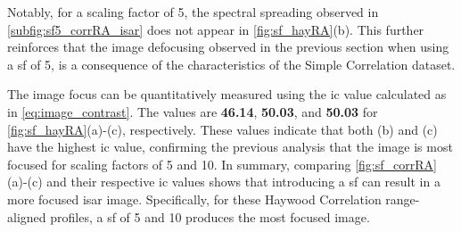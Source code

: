 \documentclass[class=report,11pt,crop=false]{standalone}
\begin{document}
    Notably, for a scaling factor of 5, the spectral spreading observed in \autoref{subfig:sf5_corrRA_isar} does not appear in \autoref{fig:sf_hayRA}(b). This further reinforces that the image defocusing observed in the previous section when using a \gls{sf} of 5, is a consequence of the characteristics of the Simple Correlation dataset.
    
    The image focus can be quantitatively measured using the \gls{ic} value calculated as in \autoref{eq:image_contrast}. The values are \textbf{46.14}, \textbf{50.03}, and \textbf{50.03} for \autoref{fig:sf_hayRA}(a)-(c), respectively. These values indicate that both (b) and (c) have the highest \gls{ic} value, confirming the previous analysis that the image is most focused for scaling factors of 5 and 10. In summary, comparing \autoref{fig:sf_corrRA}(a)-(c) and their respective \gls{ic} values shows that introducing a \gls{sf} can result in a more focused \gls{isar} image. Specifically, for these Haywood Correlation range-aligned profiles, a \gls{sf} of 5 and 10 produces the most focused image.
    
\end{document}

